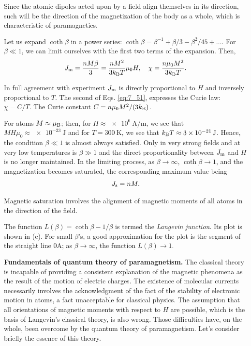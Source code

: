Since the atomic dipoles acted upon by a field align themselves in its direction, such will be the direction of the magnetization of the body as a whole, which is characteristic of paramagnetics.

Let us expand $\coth\beta$ in a power series: $\coth\beta=\beta^{-1}+\beta/3-\beta^2/45+\ldots$. For $\beta\ll 1$, we can limit ourselves with the first two terms of the expansion. Then,
\begin{equation}\label{eq:7_51}
    J_{\text{m}} = \frac{n M \beta}{3} = \frac{nM^2}{3k_{\text{B}}T} \mu_0 H,\quad \chi = \frac{n\mu_0 M^2}{3k_{\text{B}}T}.
\end{equation}

In full agreement with experiment $J_{\text{m}}$ is directly proportional to $H$ and inversely proportional to $T$. The second of Eqs. \eqref{eq:7_51}, expresses the Curie law: $\chi=C/T$. The Curie constant $C=n\mu_0 M^2/(3k_{\text{B}})$.

For atoms $M\approx\mu_{\text{B}}$; then, for $H\approx\SI{e6}{\ampere\per\metre}$, we see that $MH\mu_0\approx\SI{e-23}{\joule}$ and for $T=\SI{300}{\kelvin}$, we see that $k_{\text{B}}T\approx\SI{3e-21}{\joule}$. Hence, the condition $\beta\ll 1$ is almost always satisfied.
Only in very strong fields and at very low temperatures is $\beta\gg 1$ and the direct proportionality between $J_{\text{m}}$ and $H$ is no longer maintained. In the limiting process, as $\beta\to\infty$, $\coth\beta\to 1$, and the magnetization becomes saturated, the corresponding maximum value being
\begin{equation}\label{eq:7_52}
    J_{\text{s}} = nM.
\end{equation}

\noindent
Magnetic saturation involves the alignment of magnetic moments of all atoms in the direction of the field.

The function $L(\beta)=\coth\beta-1/\beta$ is termed the \textit{Langevin junction}. Its plot is shown in (c). For small $\beta$'s, a good approximation for the plot is the segment of the straight line $0$A; as $\beta\to\infty$, the function $L(\beta)\to 1$.

\textbf{Fundamentals of quantum theory of paramagnetism.} The classical theory is incapable of providing a consistent explanation of the magnetic phenomena as the result of the motion of electric charges. The existence of molecular currents necessarily involves the acknowledgment of the fact of the stability of electronic motion in atoms, a fact unacceptable for classical physics. The assumption that all orientations of magnetic moments with respect to $H$ are possible, which is the basis of Langevin's classical theory, is also wrong. Those
difficulties have, on the whole, been overcome by the quantum theory of paramagnetism. Let's consider briefly the essence of this theory.

